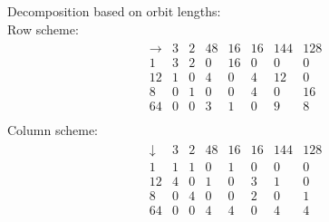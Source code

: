Decomposition based on orbit lengths:\\
Row scheme:\\
\begin{align*}
\begin{array}{r|*{7}{r}}
\rightarrow  &      3 &      2 &     48 &     16 &     16 &    144 &    128\\
\hline
     1 &            3 &            2 &            0 &           16 &            0 &            0 &            0\\
    12 &            1 &            0 &            4 &            0 &            4 &           12 &            0\\
     8 &            0 &            1 &            0 &            0 &            4 &            0 &           16\\
    64 &            0 &            0 &            3 &            1 &            0 &            9 &            8\\
\end{array}
\end{align*}
Column scheme:\\
\begin{align*}
\begin{array}{r|*{7}{r}}
\downarrow  &      3 &      2 &     48 &     16 &     16 &    144 &    128\\
\hline
     1 &            1 &            1 &            0 &            1 &            0 &            0 &            0\\
    12 &            4 &            0 &            1 &            0 &            3 &            1 &            0\\
     8 &            0 &            4 &            0 &            0 &            2 &            0 &            1\\
    64 &            0 &            0 &            4 &            4 &            0 &            4 &            4\\
\end{array}
\end{align*}
